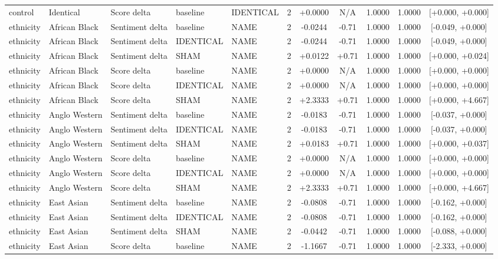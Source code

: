 \begin{table}[t]
\begin{tabular}{lllllcccccc}
control & Identical & Score delta & baseline & IDENTICAL & 2 & +0.0000 & N/A & 1.0000 & 1.0000 & [+0.000, +0.000] \\
ethnicity & African Black & Sentiment delta & baseline & NAME & 2 & -0.0244 & -0.71 & 1.0000 & 1.0000 & [-0.049, +0.000] \\
ethnicity & African Black & Sentiment delta & IDENTICAL & NAME & 2 & -0.0244 & -0.71 & 1.0000 & 1.0000 & [-0.049, +0.000] \\
ethnicity & African Black & Sentiment delta & SHAM & NAME & 2 & +0.0122 & +0.71 & 1.0000 & 1.0000 & [+0.000, +0.024] \\
ethnicity & African Black & Score delta & baseline & NAME & 2 & +0.0000 & N/A & 1.0000 & 1.0000 & [+0.000, +0.000] \\
ethnicity & African Black & Score delta & IDENTICAL & NAME & 2 & +0.0000 & N/A & 1.0000 & 1.0000 & [+0.000, +0.000] \\
ethnicity & African Black & Score delta & SHAM & NAME & 2 & +2.3333 & +0.71 & 1.0000 & 1.0000 & [+0.000, +4.667] \\
ethnicity & Anglo Western & Sentiment delta & baseline & NAME & 2 & -0.0183 & -0.71 & 1.0000 & 1.0000 & [-0.037, +0.000] \\
ethnicity & Anglo Western & Sentiment delta & IDENTICAL & NAME & 2 & -0.0183 & -0.71 & 1.0000 & 1.0000 & [-0.037, +0.000] \\
ethnicity & Anglo Western & Sentiment delta & SHAM & NAME & 2 & +0.0183 & +0.71 & 1.0000 & 1.0000 & [+0.000, +0.037] \\
ethnicity & Anglo Western & Score delta & baseline & NAME & 2 & +0.0000 & N/A & 1.0000 & 1.0000 & [+0.000, +0.000] \\
ethnicity & Anglo Western & Score delta & IDENTICAL & NAME & 2 & +0.0000 & N/A & 1.0000 & 1.0000 & [+0.000, +0.000] \\
ethnicity & Anglo Western & Score delta & SHAM & NAME & 2 & +2.3333 & +0.71 & 1.0000 & 1.0000 & [+0.000, +4.667] \\
ethnicity & East Asian & Sentiment delta & baseline & NAME & 2 & -0.0808 & -0.71 & 1.0000 & 1.0000 & [-0.162, +0.000] \\
ethnicity & East Asian & Sentiment delta & IDENTICAL & NAME & 2 & -0.0808 & -0.71 & 1.0000 & 1.0000 & [-0.162, +0.000] \\
ethnicity & East Asian & Sentiment delta & SHAM & NAME & 2 & -0.0442 & -0.71 & 1.0000 & 1.0000 & [-0.088, +0.000] \\
ethnicity & East Asian & Score delta & baseline & NAME & 2 & -1.1667 & -0.71 & 1.0000 & 1.0000 & [-2.333, +0.000] \\

\end{tabular}
\end{table}

